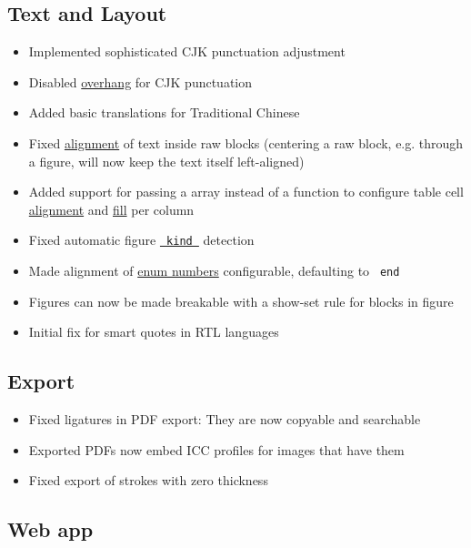 \subsection{Text and Layout}\label{text-and-layout}

\begin{itemize}
\tightlist
\item
  Implemented sophisticated CJK punctuation adjustment
\item
  Disabled
  \href{/docs/reference/text/text/\#parameters-overhang}{overhang} for
  CJK punctuation
\item
  Added basic translations for Traditional Chinese
\item
  Fixed \href{/docs/reference/text/raw/\#parameters-align}{alignment} of
  text inside raw blocks (centering a raw block, e.g. through a figure,
  will now keep the text itself left-aligned)
\item
  Added support for passing a array instead of a function to configure
  table cell
  \href{/docs/reference/model/table/\#parameters-align}{alignment} and
  \href{/docs/reference/model/table/\#parameters-fill}{fill} per column
\item
  Fixed automatic figure
  \href{/docs/reference/model/figure/\#parameters-kind}{\texttt{\ kind\ }}
  detection
\item
  Made alignment of
  \href{/docs/reference/model/enum/\#parameters-number-align}{enum
  numbers} configurable, defaulting to \texttt{\ end\ }
\item
  Figures can now be made breakable with a show-set rule for blocks in
  figure
\item
  Initial fix for smart quotes in RTL languages
\end{itemize}

\subsection{Export}\label{export}

\begin{itemize}
\tightlist
\item
  Fixed ligatures in PDF export: They are now copyable and searchable
\item
  Exported PDFs now embed ICC profiles for images that have them
\item
  Fixed export of strokes with zero thickness
\end{itemize}

\subsection{Web app}\label{web-app}

